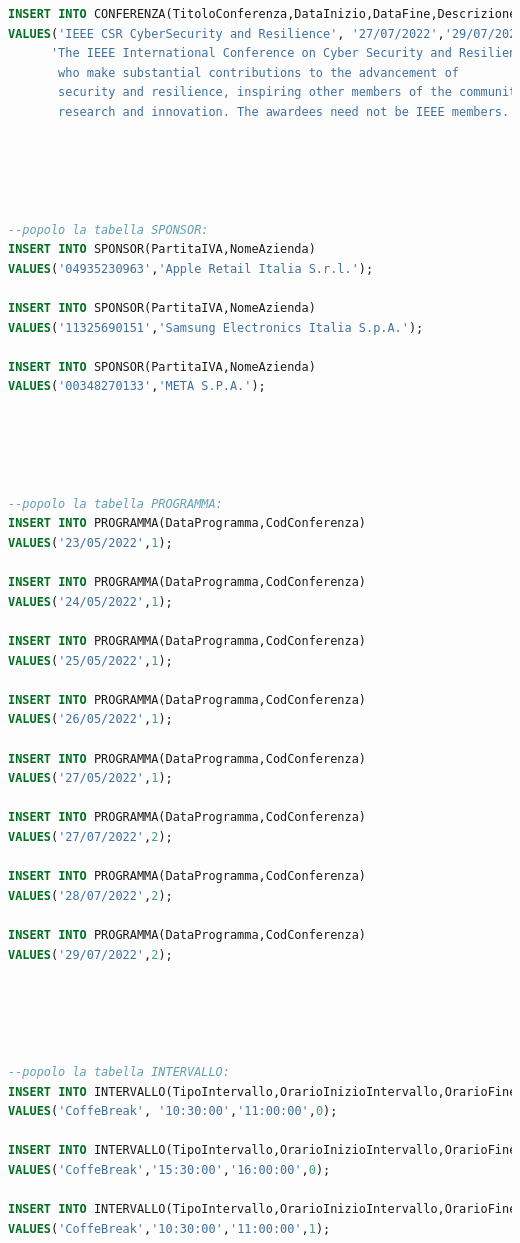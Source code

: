 \documentclass[a4page]{article}
\begin{document}
\begin{lstlisting}[language=SQL,
        deletekeywords={IDENTITY,INT},
        morekeywords={clustered},    
        framesep=10pt,
        framextopmargin=10pt]
INSERT INTO CONFERENZA(TitoloConferenza,DataInizio,DataFine,Descrizione,NomeSede)
VALUES('IEEE CSR CyberSecurity and Resilience', '27/07/2022','29/07/2022',
	  'The IEEE International Conference on Cyber Security and Resilience recognizes outstanding individuals
	   who make substantial contributions to the advancement of
	   security and resilience, inspiring other members of the community with their pioneering
	   research and innovation. The awardees need not be IEEE members.','monte sant''angelo');





--popolo la tabella SPONSOR:
INSERT INTO SPONSOR(PartitaIVA,NomeAzienda)
VALUES('04935230963','Apple Retail Italia S.r.l.');

INSERT INTO SPONSOR(PartitaIVA,NomeAzienda)
VALUES('11325690151','Samsung Electronics Italia S.p.A.');

INSERT INTO SPONSOR(PartitaIVA,NomeAzienda)
VALUES('00348270133','META S.P.A.');





--popolo la tabella PROGRAMMA:
INSERT INTO PROGRAMMA(DataProgramma,CodConferenza)
VALUES('23/05/2022',1);

INSERT INTO PROGRAMMA(DataProgramma,CodConferenza)
VALUES('24/05/2022',1);

INSERT INTO PROGRAMMA(DataProgramma,CodConferenza)
VALUES('25/05/2022',1);

INSERT INTO PROGRAMMA(DataProgramma,CodConferenza)
VALUES('26/05/2022',1);

INSERT INTO PROGRAMMA(DataProgramma,CodConferenza)
VALUES('27/05/2022',1);

INSERT INTO PROGRAMMA(DataProgramma,CodConferenza)
VALUES('27/07/2022',2);

INSERT INTO PROGRAMMA(DataProgramma,CodConferenza)
VALUES('28/07/2022',2);

INSERT INTO PROGRAMMA(DataProgramma,CodConferenza)
VALUES('29/07/2022',2);





--popolo la tabella INTERVALLO:
INSERT INTO INTERVALLO(TipoIntervallo,OrarioInizioIntervallo,OrarioFineIntervallo,CodProgramma)
VALUES('CoffeBreak', '10:30:00','11:00:00',0);

INSERT INTO INTERVALLO(TipoIntervallo,OrarioInizioIntervallo,OrarioFineIntervallo,CodProgramma)
VALUES('CoffeBreak','15:30:00','16:00:00',0);

INSERT INTO INTERVALLO(TipoIntervallo,OrarioInizioIntervallo,OrarioFineIntervallo,CodProgramma)
VALUES('CoffeBreak','10:30:00','11:00:00',1);


\end{lstlisting}
\end{document}
